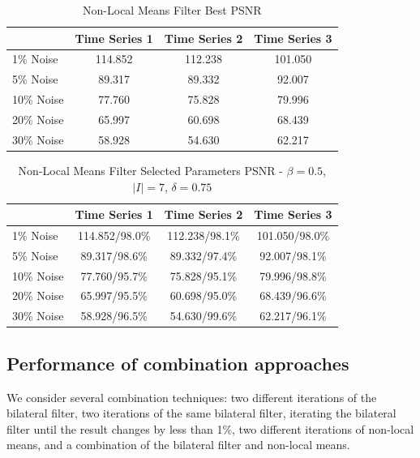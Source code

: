 \documentclass[11pt]{article}
\theoremstyle{definition}
\begin{document}
\begin{table}[!h]
\small
\begin{center}
\begin{tabular}{lccc}
\hline 
 & Time Series 1 & Time Series 2 & Time Series 3 \\ \hline
1\% Noise & 114.852 & 112.238 & 101.050 \\ \hline
5\% Noise & 89.317 & 89.332 & 92.007 \\ \hline
10\% Noise & 77.760 & 75.828 & 79.996 \\ \hline
20\% Noise & 65.997 & 60.698 & 68.439 \\ \hline
30\% Noise & 58.928 & 54.630 & 62.217 \\ \hline
\end{tabular}
\caption{Non-Local Means Filter Best PSNR}
\label{nlmeansbestpsnr}
\end{center}
\end{table}

\begin{table}[!h]
\small
\begin{center}
\begin{tabular}{lccc}
\hline
 & Time Series 1 & Time Series 2 & Time Series 3 \\ \hline
1\% Noise & 114.852/98.0\% & 112.238/98.1\% & 101.050/98.0\% \\ \hline
5\% Noise & 89.317/98.6\% & 89.332/97.4\% & 92.007/98.1\% \\ \hline
10\% Noise & 77.760/95.7\% & 75.828/95.1\% & 79.996/98.8\% \\ \hline
20\% Noise & 65.997/95.5\% & 60.698/95.0\% & 68.439/96.6\% \\ \hline
30\% Noise & 58.928/96.5\% & 54.630/99.6\% & 62.217/96.1\% \\ \hline
\end{tabular}
\caption{Non-Local Means Filter Selected Parameters PSNR - $\beta = 0.5$, $\lvert I \rvert = 7$, $\delta = 0.75$}
\label{nlmeansselectpsnr}
\end{center}
\end{table}

\subsection{Performance of combination approaches}

We consider several combination techniques: two different iterations
of the bilateral filter, two iterations of the same bilateral filter,
iterating the bilateral filter until the result changes by less than
1\%, two different iterations of non-local means, and a combination of
the bilateral filter and non-local means.
\end{document}
